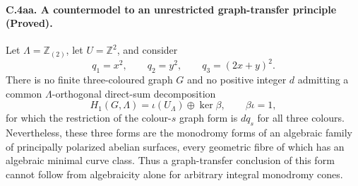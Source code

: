 \paragraph{C.4aa. A countermodel to an unrestricted graph-transfer principle (Proved).}
Let $\Lambda=\mathbb Z_{(2)}$, let $U=\mathbb Z^2$, and consider
\[
 q_1=x^2,\qquad q_2=y^2,\qquad q_3=(2x+y)^2.
\]
There is no finite three-coloured graph $G$ and no positive integer
$d$ admitting a common $\Lambda$-orthogonal direct-sum decomposition
\[
 H_1(G,\Lambda)=\iota(U_\Lambda)\oplus\ker\beta,
 \qquad \beta\iota=1,
\]
for which the restriction of the colour-$s$ graph form is $dq_s$ for
all three colours. Nevertheless, these three forms are the monodromy
forms of an algebraic family of principally polarized abelian surfaces,
every geometric fibre of which has an algebraic minimal curve class.
Thus a graph-transfer conclusion of this form cannot follow from
algebraicity alone for arbitrary integral monodromy cones.


